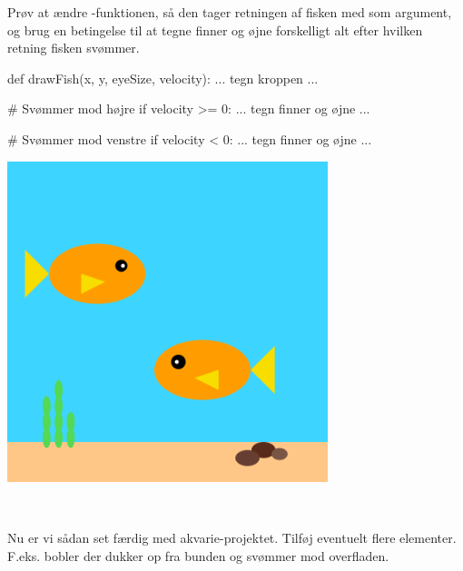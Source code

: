 \documentclass{ucph-handout}
\begin{document}
\begin{exercisebox}[adjusted title=Ændre udseende ]
Prøv at ændre -funktionen, så den tager retningen af
fisken med som argument, og brug en betingelse til at tegne finner og
øjne forskelligt alt efter hvilken retning fisken svømmer.

\begin{minipage}{0.60\linewidth}
\begin{python}
def drawFish(x, y, eyeSize, velocity):
    ... tegn kroppen ...

    # Svømmer mod højre
    if velocity >= 0:
        ... tegn finner og øjne ...

    # Svømmer mod venstre
    if velocity < 0:
        ... tegn finner og øjne ...
\end{python}
\end{minipage}
\begin{minipage}{0.40\linewidth}
\includegraphics[width=0.70\textwidth]{illustrationer/fisk-begge-retninger.png}
\end{minipage}
~
\end{exercisebox}
\begin{exercisebox}[adjusted title=Gør akvarieprojektet færdigt ]
Nu er vi sådan set færdig med akvarie-projektet. Tilføj eventuelt
flere elementer. F.eks. bobler der dukker op fra bunden og svømmer mod
overfladen.
\end{exercisebox}
\end{document}
